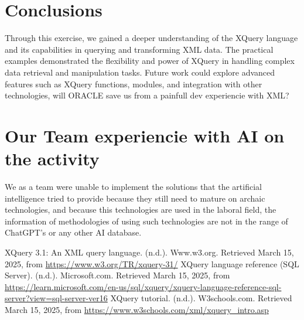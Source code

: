\documentclass[twoside]{article}
\begin{document}
\section{Conclusions}
Through this exercise, we gained a deeper understanding of the XQuery language and its capabilities in querying and transforming XML data. The practical examples demonstrated the flexibility and power of XQuery in handling complex data retrieval and manipulation tasks. Future work could explore advanced features such as XQuery functions, modules, and integration with other technologies, will ORACLE save us from a painfull dev experiencie with XML?

\section*{Our Team experiencie with AI on the activity}
We as a team were unable to implement the solutions that the artificial intelligence tried to provide because they still need to mature on archaic technologies, and because this technologies are used in the laboral field, the information of methodologies of using such technologies are not in the range of ChatGPT's or any other AI database.

\begin{thebibliography}{9}
	XQuery 3.1: An XML query language. (n.d.). Www.w3.org. Retrieved March 15, 2025, from \url{https://www.w3.org/TR/xquery-31/}
	XQuery language reference (SQL Server). (n.d.). Microsoft.com. Retrieved March 15, 2025, from \url{https://learn.microsoft.com/en-us/sql/xquery/xquery-language-reference-sql-server?view=sql-server-ver16}
	XQuery tutorial. (n.d.). W3schools.com. Retrieved March 15, 2025, from \url{https://www.w3schools.com/xml/xquery_intro.asp}
\end{thebibliography}
\end{document}
